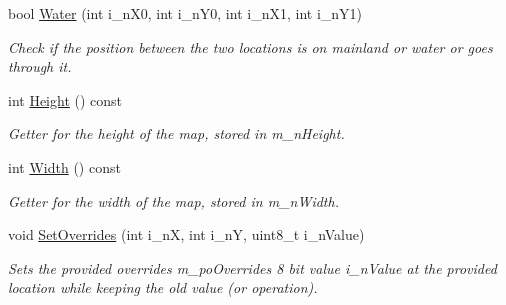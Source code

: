 \begin{DoxyCompactItemize}
bool \mbox{\hyperlink{classplanner_1_1c_graph_a99935ff4c32d229e6006aaa843a685a9}{Water}} (int i\+\_\+n\+X0, int i\+\_\+n\+Y0, int i\+\_\+n\+X1, int i\+\_\+n\+Y1)
\begin{DoxyCompactList}\small\item\em Check if the position between the two locations is on mainland or water or goes through it. \end{DoxyCompactList}\item 
int \mbox{\hyperlink{classplanner_1_1c_graph_a5c163af76e19303794a908304f3b759e}{Height}} () const
\begin{DoxyCompactList}\small\item\em Getter for the height of the map, stored in m\+\_\+n\+Height. \end{DoxyCompactList}\item 
int \mbox{\hyperlink{classplanner_1_1c_graph_a25e3f4ee33c86a8a0c3a31c42dac7607}{Width}} () const
\begin{DoxyCompactList}\small\item\em Getter for the width of the map, stored in m\+\_\+n\+Width. \end{DoxyCompactList}\item 
void \mbox{\hyperlink{classplanner_1_1c_graph_a6da6e6e269013628aef48245a7787cb9}{Set\+Overrides}} (int i\+\_\+nX, int i\+\_\+nY, uint8\+\_\+t i\+\_\+n\+Value)
\begin{DoxyCompactList}\small\item\em Sets the provided overrides m\+\_\+po\+Overrides 8 bit value i\+\_\+n\+Value at the provided location while keeping the old value (or operation). \end{DoxyCompactList}\end{DoxyCompactItemize}
